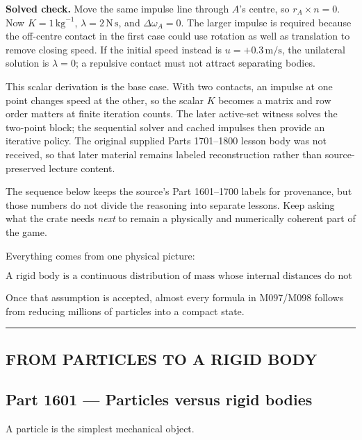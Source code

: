 \textbf{Solved check.} Move the same impulse line through \(A\)'s centre, so \(r_A\times n=0\). Now \(K=1\,\mathrm{kg}^{-1}\), \(\lambda=2\,\mathrm{N\,s}\), and \(\Delta\omega_A=0\). The larger impulse is required because the off-centre contact in the first case could use rotation as well as translation to remove closing speed. If the initial speed instead is \(u=+0.3\,\mathrm{m/s}\), the unilateral solution is \(\lambda=0\); a repulsive contact must not attract separating bodies.

This scalar derivation is the base case. With two contacts, an impulse at one point changes speed at the other, so the scalar \(K\) becomes a matrix and row order matters at finite iteration counts. The later active-set witness solves the two-point block; the sequential solver and cached impulses then provide an iterative policy. The original supplied Parts 1701--1800 lesson body was not received, so that later material remains labeled reconstruction rather than source-preserved lecture content.

The sequence below keeps the source's Part 1601--1700 labels for provenance, but those numbers do not divide the reasoning into separate lessons. Keep asking what the crate needs \emph{next} to remain a physically and numerically coherent part of the game.

Everything comes from one physical picture:

\[
\boxed{
\text{A rigid body is a continuous distribution of mass whose internal distances do not change.}
}
\]

Once that assumption is accepted, almost every formula in M097/M098 follows from reducing millions of particles into a compact state.

\begin{center}\rule{0.5\linewidth}{0.5pt}\end{center}

\subsection{FROM PARTICLES TO A RIGID BODY}\label{06-engine-ii-ch034-from-particles-to-a-rigid-body}

\subsection{Part 1601 --- Particles versus rigid bodies}\label{06-engine-ii-ch034-part-1601-particles-versus-rigid-bodies}

A particle is the simplest mechanical object.

